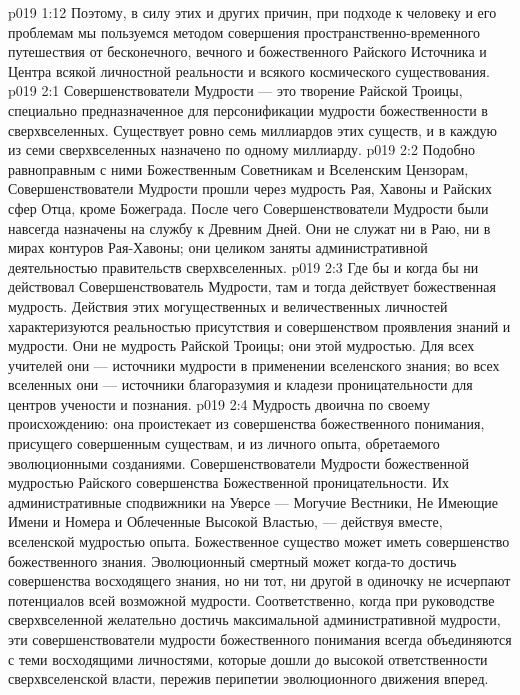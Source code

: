 \vs p019 1:12 \pc Поэтому, в силу этих и других причин, при подходе к человеку и его проблемам мы пользуемся методом совершения пространственно\hyp{}временного путешествия от бесконечного, вечного и божественного Райского Источника и Центра всякой личностной реальности и всякого космического существования.
\vs p019 2:1 Совершенствователи Мудрости --- это творение Райской Троицы, специально предназначенное для персонификации мудрости божественности в сверхвселенных. Существует ровно семь миллиардов этих существ, и в каждую из семи сверхвселенных назначено по одному миллиарду.
\vs p019 2:2 Подобно равноправным с ними Божественным Советникам и Вселенским Цензорам, Совершенствователи Мудрости прошли через мудрость Рая, Хавоны и Райских сфер Отца, кроме Божеграда. После чего Совершенствователи Мудрости были навсегда назначены на службу к Древним Дней. Они не служат ни в Раю, ни в мирах контуров Рая\hyp{}Хавоны; они целиком заняты административной деятельностью правительств сверхвселенных.
\vs p019 2:3 \pc Где бы и когда бы ни действовал Совершенствователь Мудрости, там и тогда действует божественная мудрость. Действия этих могущественных и величественных личностей характеризуются реальностью присутствия и совершенством проявления знаний и мудрости. Они не  мудрость Райской Троицы; они  этой мудростью. Для всех учителей они --- источники мудрости в применении вселенского знания; во всех вселенных они --- источники благоразумия и кладези проницательности для центров учености и познания.
\vs p019 2:4 Мудрость двоична по своему происхождению: она проистекает из совершенства божественного понимания, присущего совершенным существам, и из личного опыта, обретаемого эволюционными созданиями. Совершенствователи Мудрости  божественной мудростью Райского совершенства Божественной проницательности. Их административные сподвижники на Уверсе --- Могучие Вестники, Не Имеющие Имени и Номера и Облеченные Высокой Властью, --- действуя вместе,  вселенской мудростью опыта. Божественное существо может иметь совершенство божественного знания. Эволюционный смертный может когда\hyp{}то достичь совершенства восходящего знания, но ни тот, ни другой в одиночку не исчерпают потенциалов всей возможной мудрости. Соответственно, когда при руководстве сверхвселенной желательно достичь максимальной административной мудрости, эти совершенствователи мудрости божественного понимания всегда объединяются с теми восходящими личностями, которые дошли до высокой ответственности сверхвселенской власти, пережив перипетии эволюционного движения вперед.
